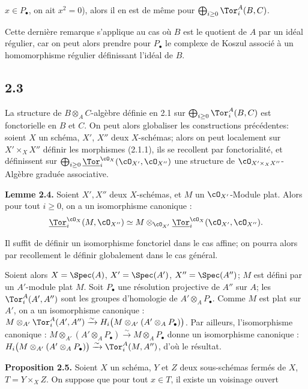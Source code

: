 \(x\in P_\bullet\), on ait \(x^2=0\)), alors il en est de même pour \(\bigoplus_{i\ge0}\Tor_i^A(B,C)\).

Cette dernière remarque s'applique au cas où \(B\) est le quotient de \(A\) par un idéal régulier, car on peut alors prendre pour \(P_\bullet\) le complexe de Koszul associé à un homomorphisme régulier définissant l'idéal de \(B\).

\subsection*{2.3}
La structure de \(B\otimes_A C\)-algèbre définie en 2.1 sur \(\bigoplus_{i\ge0}\Tor_i^A(B,C)\) est fonctorielle en \(B\) et \(C\). On peut alors globaliser les constructions précédentes: soient \(X\) un schéma, \(X'\), \(X''\) deux \(X\)-schémas; alors on peut localement sur \(X'\times_X X''\) définir les morphismes (2.1.1), ils se recollent par fonctorialité, et définissent sur \(\bigoplus_{i\ge0}\underline{\Tor}_i^{\cO_X}(\cO_{X'},\cO_{X''})\) une structure de \(\cO_{X'\times_X X''}\)-Algèbre graduée associative.

\textbf{Lemme 2.4.} Soient \(X',X''\) deux \(X\)-schémas, et \(M\) un \(\cO_{X'}\)-Module plat. Alors pour tout \(i\ge0\), on a un isomorphisme canonique :
\begin{equation}\notag
\underline{\Tor}_i^{\cO_X}(M,\cO_{X''})\simeq
M\otimes_{\cO_{X'}}\underline{\Tor}_i^{\cO_X}(\cO_{X'},\cO_{X''}).
\end{equation}

Il suffit de définir un isomorphisme fonctoriel dans le cas affine; on pourra alors par recollement le définir globalement dans le cas général.

Soient alors \(X=\Spec(A)\), \(X'=\Spec(A')\), \(X''=\Spec(A'')\); \(M\) est défini par un \(A'\)-module plat \(M\). Soit \(P_\bullet\) une résolution projective de \(A''\) sur \(A\); les \(\Tor_i^A(A',A'')\) sont les groupes d'homologie de \(A'\otimes_A P_\bullet\). Comme \(M\) est plat sur \(A'\), on a un isomorphisme canonique : \(M\otimes_{A'}\Tor_i^A(A',A'')\xrightarrow{\sim}H_i\bigl(M\otimes_{A'}(A'\otimes_A P_\bullet)\bigr)\). Par ailleurs, l'isomorphisme canonique : \(M\otimes_{A'}(A'\otimes_A P_\bullet)\xrightarrow{\sim}M\otimes_A P_\bullet\) donne un isomorphisme canonique : \(H_i\bigl(M\otimes_{A'}(A'\otimes_A P_\bullet)\bigr)\xrightarrow{\sim}\Tor_i^A(M,A'')\), d'où le résultat.

\textbf{Proposition 2.5.} Soient \(X\) un schéma, \(Y\) et \(Z\) deux sous-schémas fermés de \(X\), \(T=Y\times_X Z\). On suppose que pour tout \(x\in T\), il existe un voisinage ouvert
